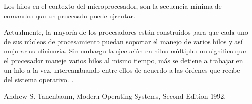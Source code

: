 \documentclass[12pt,a4paper]{report}
\begin{document}
    \vspace{1cm}
       Los hilos en el contexto del microprocesador, son la secuencia mínima de comandos que un procesado puede ejecutar.
       
     \vspace{1cm}
     
       Actualmente, la mayoría de los procesadores están construidos para que cada uno de sus núcleos de procesamiento puedan soportar el manejo de varios hilos y así mejorar su eficiencia. Sin embargo la ejecución en hilos múltiples no significa que el procesador maneje varios hilos al mismo tiempo, más se detiene a trabajar en un hilo a la vez, intercambiando entre ellos de acuerdo a las órdenes que recibe del sistema operativo.  \cite{Andrew S. 1992}.
   
   
    

\begin{thebibliography}{0}



   Andrew S. Tanenbaum, Modern Operating Systems, Second Edition 1992.
  

  
\end{thebibliography}
\end{document}
